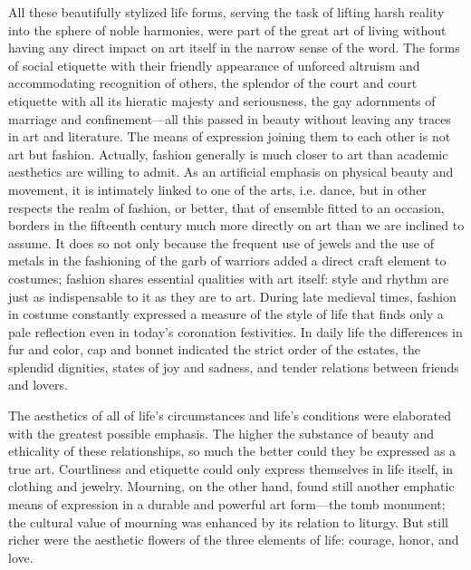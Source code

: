 All these beautifully stylized life forms, serving the task of lifting
harsh reality into the sphere of noble harmonies, were part of the great
art of living without having any direct impact on art itself in the
narrow sense of the word. The forms of social etiquette with their
friendly appearance of unforced altruism and accommodating recognition
of others, the splendor of the court and court etiquette with all its
hieratic majesty and seriousness, the gay adornments of marriage and
confinement---all this passed in beauty without leaving any traces in
art and literature. The means of expression joining them to each other
is not art but fashion. Actually, fashion generally is much closer to
art than academic aesthetics are willing to
\protect\hypertarget{09_Chapter_Two__THE_CRAVING_FOR_A_M.xhtmlux5cux23page_60}{}{}admit.
As an artificial emphasis on physical beauty and movement, it is
intimately linked to one of the arts, i.e. dance, but in other respects
the realm of fashion, or better, that of ensemble fitted to an occasion,
borders in the fifteenth century much more directly on art than we are
inclined to assume. It does so not only because the frequent use of
jewels and the use of metals in the fashioning of the garb of warriors
added a direct craft element to costumes; fashion shares essential
qualities with art itself: style and rhythm are just as indispensable to
it as they are to art. During late medieval times, fashion in costume
constantly expressed a measure of the style of life that finds only a
pale reflection even in today's coronation festivities. In daily life
the differences in fur and color, cap and bonnet indicated the strict
order of the estates, the splendid dignities, states of joy and sadness,
and tender relations between friends and lovers.

The aesthetics of all of life's circumstances and life's conditions were
elaborated with the greatest possible emphasis. The higher the substance
of beauty and ethicality of these relationships, so much the better
could they be expressed as a true art. Courtliness and etiquette could
only express themselves in life itself, in clothing and jewelry.
Mourning, on the other hand, found still another emphatic means of
expression in a durable and powerful art form---the tomb monument; the
cultural value of mourning was enhanced by its relation to liturgy. But
still richer were the aesthetic flowers of the three elements of life:
courage, honor, and love.